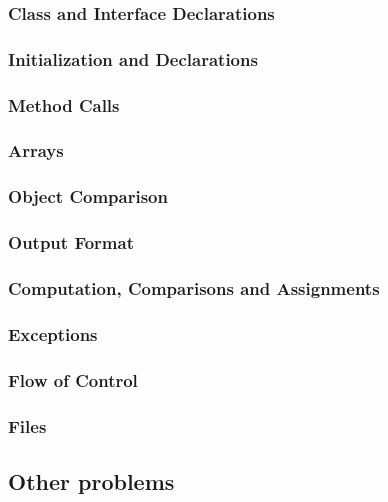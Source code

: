 \subsubsection{Class and Interface Declarations}
    
    
\subsubsection{Initialization and Declarations}
    
    
\subsubsection{Method Calls}
    
    
\subsubsection{Arrays}
    
    
\subsubsection{Object Comparison}
    
    
\subsubsection{Output Format}
    
    
\subsubsection{Computation, Comparisons and Assignments}
    
    
\subsubsection{Exceptions}
    
    
\subsubsection{Flow of Control}
    
    
\subsubsection{Files}
    

\subsection{Other problems}
    